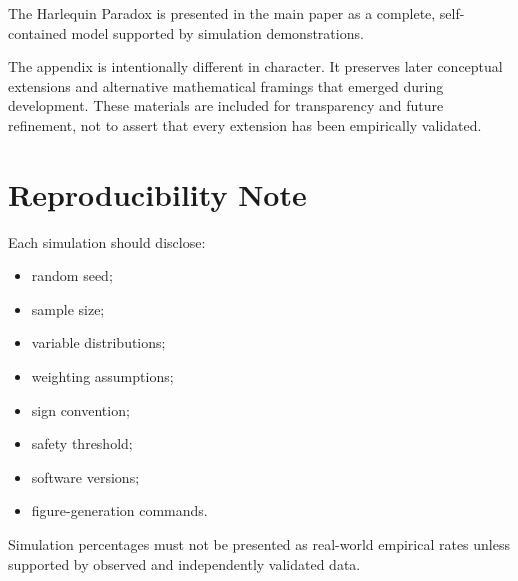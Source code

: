 \documentclass[11pt]{article}
\begin{document}
The Harlequin Paradox is presented in the main paper as a complete, self-contained model supported by simulation demonstrations.

The appendix is intentionally different in character. It preserves later conceptual extensions and alternative mathematical framings that emerged during development. These materials are included for transparency and future refinement, not to assert that every extension has been empirically validated.

\section{Reproducibility Note}

Each simulation should disclose:

\begin{itemize}
\item random seed;
\item sample size;
\item variable distributions;
\item weighting assumptions;
\item sign convention;
\item safety threshold;
\item software versions;
\item figure-generation commands.
\end{itemize}

Simulation percentages must not be presented as real-world empirical rates unless supported by observed and independently validated data.
\end{document}
